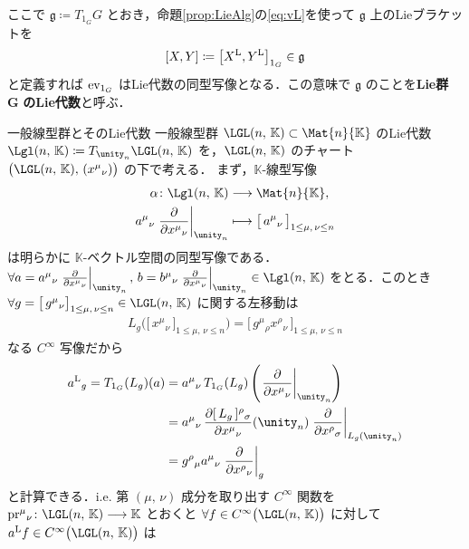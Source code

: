 \documentclass[TQFT_main]{subfiles}
\begin{document}
ここで $\bm{\mathfrak{g}} \coloneqq T_{1_G} G$ とおき，命題\ref{prop:LieAlg}の\eqref{eq:vL}を使って $\mathfrak{g}$ 上のLieブラケットを
\begin{align}
    \comm{X}{Y} \coloneqq \comm{\Lie{X}}{\Lie{Y}}_{1_G} \in \mathfrak{g}
\end{align}
と定義すれば $\mathrm{ev}_{1_G}$ はLie代数の同型写像となる．この意味で $\mathfrak{g}$ のことを\textbf{Lie群} $\bm{G}$ \textbf{のLie代数}と呼ぶ．

\begin{myexample}[label=ex:gl]{一般線型群とそのLie代数}
    一般線型群 $\LGL(n,\, \mathbb{K}) \subset \Mat{n}{\mathbb{K}}$ のLie代数 $\Lgl(n,\, \mathbb{K}) \coloneqq T_{\unity_n} \LGL(n,\, \mathbb{K})$ を，$\LGL(n,\,\mathbb{K})$ のチャート $\bigl( \LGL(n,\,\mathbb{K}),\, (x^\mu{}_\nu) \bigr)$ の下で考える．
    まず，$\mathbb{K}$-線型写像
    \begin{align}
        \alpha \colon \Lgl(n,\, \mathbb{K}) &\lto \Mat{n}{\mathbb{K}}, \\
        a^\mu{}_\nu \eval{\pdv{}{x^\mu{}_\nu}}_{\unity_n} &\lmto \bigl[\, a^\mu{}_\nu \,\bigr]_{1 \le \mu,\, \nu \le n}
    \end{align}
    は明らかに $\mathbb{K}$-ベクトル空間の同型写像である．
    $\forall a = a^\mu{}_\nu \eval{\pdv{}{x^\mu{}_\nu}}_{\unity_n} ,\, b = b^\mu{}_\nu \eval{\pdv{}{x^\mu{}_\nu}}_{\unity_n} \in \Lgl(n,\, \mathbb{K})$ 
    をとる．このとき $\forall g = \bigl[ \, g^{\mu}{}_\nu \bigr]_{1 \le \mu,\, \nu \le n} \in \LGL(n,\, \mathbb{K})$ に関する左移動は
    \begin{align}
        L_g \bigl(\bigl[\, x^\mu{}_\nu \,\bigr]_{1 \le \mu,\, \nu \le n} \bigr) 
        = \bigl[\, g^\mu{}_\rho x^\rho{}_\nu \,\bigr]_{1 \le \mu,\, \nu \le n}
    \end{align}
    なる $C^\infty$ 写像だから
    \begin{align}
        \Lie{a}{}_g = T_{1_G} (L_g) (a) 
        &= a^\mu{}_\nu\, T_{1_G} (L_g) \left( \eval{\pdv{}{x^\mu{}_\nu}}_{\unity_n} \right) \\
        &= a^\mu{}_\nu\, \pdv{[\, L_g \,]^\rho{}_\sigma}{x^\mu{}_\nu}()(\unity_n) \eval{\pdv{}{x^\rho{}_\sigma}}_{L_g(\unity_n)} \\
        &= g^\rho{}_\mu a^\mu{}_\nu \eval{\pdv{}{x^\rho{}_\nu}}_{g}
    \end{align}
    と計算できる．i.e. 第 $(\mu,\, \nu)$ 成分を取り出す $C^\infty$ 関数を $\mathrm{pr}^\mu{}_\nu \colon \LGL(n,\, \mathbb{K}) \lto \mathbb{K}$ とおくと  $\forall f \in C^\infty\bigl(\LGL(n,\, \mathbb{K})\bigr)$ に対して $\Lie{a} f \in C^\infty \bigl(\LGL(n,\, \mathbb{K})\bigr)$ は

\end{myexample}
\end{document}
